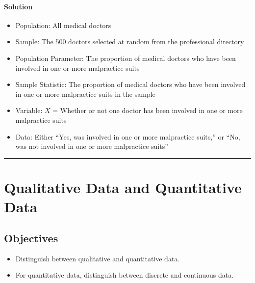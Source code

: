 \documentclass[letterpaper,10pt,english]{jupyterBook}
\begin{document}
\paragraph{Solution}
\label{\detokenize{Ch1 Sampling and Data/1.1 Key Terms in Statistics:id6}}\begin{itemize}
\item {} 
\sphinxAtStartPar
Population: All medical doctors

\item {} 
\sphinxAtStartPar
Sample: The 500 doctors selected at random from the professional directory

\item {} 
\sphinxAtStartPar
Population Parameter: The proportion of medical doctors who have been involved in one or more malpractice suits

\item {} 
\sphinxAtStartPar
Sample Statistic: The proportion of medical doctors who have been involved in one or more malpractice suits in the sample

\item {} 
\sphinxAtStartPar
Variable: \(X\) = Whether or not one doctor has been involved in one or more malpractice suits

\item {} 
\sphinxAtStartPar
Data: Either “Yes, was involved in one or more malpractice suits,” or “No, was not involved in one or more malpractice suits”

\end{itemize}


\bigskip\hrule\bigskip


\sphinxstepscope


\section{Qualitative Data and Quantitative Data}
\label{\detokenize{Ch1 Sampling and Data/1.2 Scales of Measurement:qualitative-data-and-quantitative-data}}\label{\detokenize{Ch1 Sampling and Data/1.2 Scales of Measurement::doc}}

\subsection{Objectives}
\label{\detokenize{Ch1 Sampling and Data/1.2 Scales of Measurement:objectives}}\begin{itemize}
\item {} 
\sphinxAtStartPar
Distinguish between qualitative and quantitative data.

\item {} 
\sphinxAtStartPar
For quantitative data, distinguish between discrete and continuous data.

\end{itemize}
\end{document}

